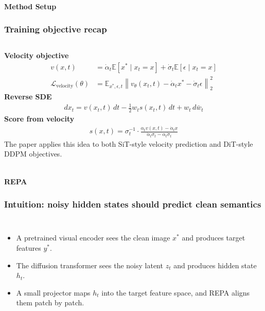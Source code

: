 \begin{frame}[t]
  \framesubtitle{Method Setup}
  \frametitle{Training objective recap}
  \begin{columns}[T,totalwidth=\textwidth]
    \textbf{Velocity objective}
    \begin{align*}
      v(x,t) &= \dot{\alpha}_t \mathbb{E}[x^\ast \mid x_t=x] + \dot{\sigma}_t \mathbb{E}[\epsilon \mid x_t=x] \\
      \mathcal{L}_{\text{velocity}}(\theta) &= \mathbb{E}_{x^\ast,\epsilon,t}
      \left\|v_\theta(x_t,t) - \dot{\alpha}_t x^\ast - \dot{\sigma}_t \epsilon \right\|_2^2
    \end{align*}
    \vspace{0.1cm}
    \textbf{Reverse SDE}
    \begin{align*}
      dx_t = v(x_t,t)\,dt - \tfrac{1}{2}w_t s(x_t,t)\,dt + w_t\,d\bar{w}_t
    \end{align*}
    \textbf{Score from velocity}
    \begin{align*}
      s(x,t)=\sigma_t^{-1}\cdot
      \frac{\alpha_t v(x,t)-\dot{\alpha}_t x}
           {\dot{\alpha}_t \sigma_t - \alpha_t \dot{\sigma}_t}
    \end{align*}
    \vspace{0.16cm}
    \vspace{0.16cm}
    {\small The paper applies this idea to both SiT-style velocity prediction and DiT-style DDPM objectives.}
  \end{columns}
\end{frame}

\begin{frame}[t]
  \framesubtitle{REPA}
  \frametitle{Intuition: noisy hidden states should predict clean semantics}
  \begin{columns}[T,totalwidth=\textwidth]
    \begin{itemize}
      \item A pretrained visual encoder sees the clean image \(x^\ast\) and produces target features \(y^\ast\).
      \item The diffusion transformer sees the noisy latent \(z_t\) and produces hidden state \(h_t\).
      \item A small projector maps \(h_t\) into the target feature space, and REPA aligns them patch by patch.
    \end{itemize}
    \vspace{0.14cm}
    \FigThree[width=\linewidth]
  \end{columns}
\end{frame}

